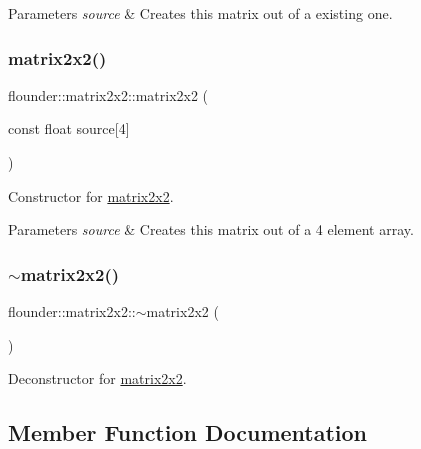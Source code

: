 \begin{DoxyParams}{Parameters}
{\em source} & Creates this matrix out of a existing one. \\
\hline
\end{DoxyParams}
\mbox{\label{classflounder_1_1matrix2x2_a4b45919974b7aa8c771b4077b9a8017e}} 
\subsubsection{\texorpdfstring{matrix2x2()}{matrix2x2()}\hspace{0.1cm}{\footnotesize\ttfamily [3/3]}}
{\footnotesize\ttfamily flounder\+::matrix2x2\+::matrix2x2 (\begin{DoxyParamCaption}\item[{const float}]{source\mbox{[}4\mbox{]} }\end{DoxyParamCaption})}



Constructor for \hyperlink{classflounder_1_1matrix2x2}{matrix2x2}. 


\begin{DoxyParams}{Parameters}
{\em source} & Creates this matrix out of a 4 element array. \\
\hline
\end{DoxyParams}
\mbox{\label{classflounder_1_1matrix2x2_a8bbacd384a0e30207d45f1e5f20c50fc}} 
\subsubsection{\texorpdfstring{$\sim$matrix2x2()}{~matrix2x2()}}
{\footnotesize\ttfamily flounder\+::matrix2x2\+::$\sim$matrix2x2 (\begin{DoxyParamCaption}{ }\end{DoxyParamCaption})}



Deconstructor for \hyperlink{classflounder_1_1matrix2x2}{matrix2x2}. 



\subsection{Member Function Documentation}
\mbox{\label{classflounder_1_1matrix2x2_a82865bd17dfc15ab8b31f13b814310fe}} 
